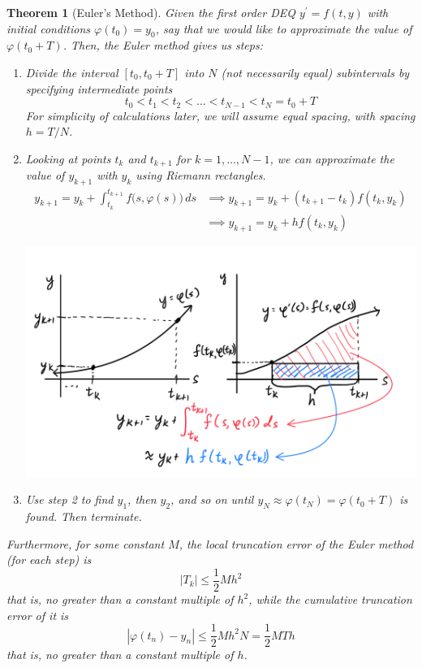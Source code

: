\documentclass{article}
\newtheorem{theorem}{Theorem}[section]
\theoremstyle{remark}
\theoremstyle{definition}
\begin{document}
    \begin{theorem}[Euler's Method]
    Given the first order DEQ $y^\prime = f(t, y)$ with initial conditions $\varphi(t_0) = y_0$, say that we would like to approximate the value of $\varphi(t_0 + T)$. Then, the \textit{Euler method} gives us steps: 
    \begin{enumerate}
        \item Divide the interval $[t_0, t_0 + T]$ into $N$ (not necessarily equal) subintervals by specifying intermediate points
        \[t_0 < t_1 < t_2 < \ldots < t_{N-1} < t_N = t_0 + T\]
        For simplicity of calculations later, we will assume equal spacing, with spacing $h = T/N$. 
        \item Looking at points $t_k$ and $t_{k+1}$ for $k = 1, \ldots, N-1$, we can approximate the value of $y_{k+1}$ with $y_k$ using Riemann rectangles. 
        \begin{align*}
            y_{k+1} = y_k + \int_{t_k}^{t_{k+1}} f\big(s, \varphi(s)\big)\,ds  & \implies y_{k+1} = y_k + (t_{k+1} - t_k) f(t_k, y_k) \\
            & \implies y_{k+1} = y_k + h f(t_k, y_k)
        \end{align*}
        \begin{center}
            \includegraphics[scale=0.25]{img/Eulers_Method.PNG}
        \end{center}
        \item Use step 2 to find $y_1$, then $y_2$, and so on until $y_N \approx \varphi(t_N) = \varphi(t_0 + T)$ is found. Then terminate. 
    \end{enumerate}
    Furthermore, for some constant $M$, the local truncation error of the Euler method (for each step) is 
    \[|T_k| \leq \frac{1}{2} M h^2\]
    that is, no greater than a constant multiple of $h^2$, while the cumulative truncation error of it is
    \[|\varphi(t_n) - y_n| \leq \frac{1}{2} M h^2 N = \frac{1}{2} M T h\]
    that is, no greater than a constant multiple of $h$. 
    \end{theorem}
\end{document}
